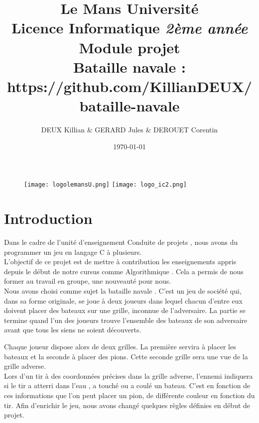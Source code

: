 \documentclass[a4paper,12pt]{article}
\begin{document}
\begin {figure}
\texttt{[image: logolemansU.png]}
\hspace{150pt} 
\texttt{[image: logo\_ic2.png]}
\end {figure}
\title {\textbf {\color {blue} Le Mans Université}\color{black}
\\  Licence Informatique  \textit {2ème année}
 \\Module projet
 \\ \textbf {Bataille navale : https://github.com/KillianDEUX/bataille-navale}}
\author{DEUX Killian & GERARD Jules & DEROUET Corentin}

\date{\today} 
\maketitle 
\newpage
\tableofcontents
\newpage


 
\section {Introduction}
 	Dans le cadre de l'unité d'enseignement \og Conduite de projets \fg{}, nous avons du programmer un jeu en langage C à plusieurs. \vspace{2\baselineskip}\\
    L'objectif de ce projet est de mettre à contribution les enseignements appris depuis le début de notre cursus comme \og Algorithmique \fg{}. Cela a permis de nous former au travail en groupe, une nouveauté pour nous.
    \vspace{2\baselineskip}\\
    Nous avons choisi comme sujet la \og bataille navale \fg{}. C'est un jeu de société qui, dans sa forme originale, se joue à deux joueurs dans lequel chacun d'entre eux doivent placer des bateaux sur une grille, inconnue de l'adversaire. La partie se termine quand l'un des joueurs trouve l'ensemble des bateaux de son adversaire avant que tous les siens ne soient découverts. \vspace{2\baselineskip}
    
    Chaque joueur dispose alors de deux grilles. La première servira à placer les bateaux et la seconde à placer des pions. Cette seconde grille sera une vue de la grille adverse.
        \vspace{2\baselineskip}\\
        Lors d'un tir à des coordonnées précises dans la grille adverse, l'ennemi indiquera si le tir a atterri \og dans l'eau \fg{}, a \og touché \fg{} ou a \og coulé \fg{} un bateau. C'est en fonction de ces informations que l'on peut placer un pion, de différente couleur en fonction du tir. Afin d'enrichir le jeu, nous avons changé quelques règles  définies en début de projet. \\
 
\end{document}
